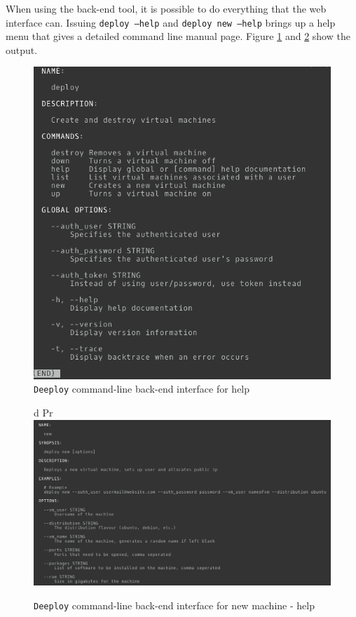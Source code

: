 \documentclass{article}
\begin{document}
When using the back-end tool, it is possible to do everything that the web interface can. Issuing \texttt{deploy --help} and \texttt{deploy new --help} brings up a help menu that gives a detailed command line manual page. Figure \ref{fig:deeploy-help} and \ref{fig:deeploy-new-help} show the output.

\begin{figure}[h!]
	\vspace{0.5cm}
	\includegraphics[width=12cm]{deeploy_help_cli.png}
	\vspace{0.5cm}
	\caption{\texttt{Deeploy} command-line back-end interface for help}
	\label{fig:deeploy-help}
\end{figure}

\begin{figure}[h!]
d Pr\vspace{0.5cm}
\includegraphics[width=12cm]{deeploy_new_help_cli.png}
\vspace{0.5cm}
\caption{\texttt{Deeploy} command-line back-end interface for new machine - help}
\label{fig:deeploy-new-help}
\end{figure}
\end{document}
